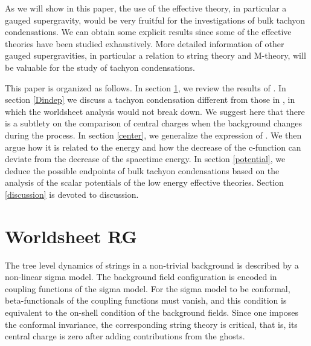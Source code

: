 \documentclass[a4paper,a4paper]{article}
\begin{document}
As we will show in this paper, the use of the effective theory, in particular a gauged supergravity, would be very 
fruitful for the investigations of bulk tachyon condensations. 
We can obtain some explicit results since some of the effective theories have been studied exhaustively. 
More detailed information of other gauged supergravities, in particular a relation to string theory and M-theory, 
will be valuable for the study of tachyon condensations. 

This paper is organized as follows. 
In section \ref{Ddep}, we review the results of \cite{suyama}. 
In section \ref{Dindep} we discuss a tachyon condensation different from those in \cite{suyama}, in which the 
worldsheet analysis would not break down. 
We suggest here that there is a subtlety on the comparison of central charges when the background changes during 
the process. 
In section \ref{center}, we generalize the expression of \cite{Tseytlin}. 
We then argue how it is related to the energy and how the decrease of the 
c-function can deviate from the decrease of the spacetime energy. 
In section \ref{potential}, we deduce the possible endpoints of bulk tachyon condensations based on the analysis 
of the scalar potentials of the low energy effective theories. 
Section \ref{discussion} is devoted to discussion. 





















\vspace{1cm}

\section{Worldsheet RG}  \label{Ddep}

\vspace{5mm}

The tree level dynamics of strings in a non-trivial background is described by a non-linear sigma 
model. 
The background field configuration is encoded in coupling functions of the sigma model. 
For the sigma model to be conformal, beta-functionals of the coupling functions must vanish, and this 
condition is equivalent to the on-shell condition of the background fields. 
Since one imposes the conformal invariance, the corresponding string theory is critical, that is, its 
central charge is zero after adding contributions from the ghosts. 
\end{document}
